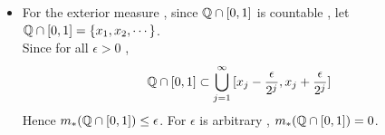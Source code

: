\begin{defn}
\begin{rmk}
\begin{itemize}
\begin{example}
\begin{itemize}
						\item For the exterior measure , since $\mathbb{Q} \cap [0 , 1]$ is countable , let $\mathbb{Q} \cap [0 , 1]=  \{ x_1 , x_2 , \cdots \}$.\\
						Since for all $\epsilon > 0$ ,
						\begin{align}
							\mathbb{Q} \cap [0 , 1] \subset \bigcup_{j = 1}^{\infty}{[x_j - \frac{\epsilon}{2^j} , x_j + \frac{\epsilon}{2^j}]}
						\end{align}
						Hence $m_{*}(\mathbb{Q} \cap [0 , 1]) \leq \epsilon$. For $\epsilon$ is arbitrary , $m_{*}(\mathbb{Q} \cap [0 , 1]) = 0$.
					\end{itemize}
				\end{example}
			\end{itemize}
		\end{rmk}
	\end{defn}

\newpage
